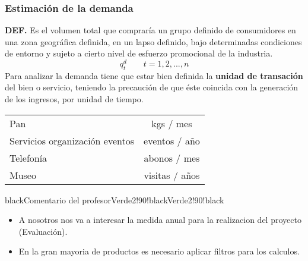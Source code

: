 \documentclass{templateNote}
\begin{document}
\subsubsection{Estimación de la demanda}
\textbf{DEF.} Es el volumen total que compraría un grupo definido de consumidores en una zona geográfica definida, en un lapso definido, bajo determinadas condiciones de entorno y sujeto a cierto nivel de esfuerzo promocional de la industria.
\begin{equation*}
  q_t^d \qquad t = 1,2,...,n
\end{equation*}
Para analizar la demanda tiene que estar bien definida la \textbf{unidad de transación} del bien o servicio, teniendo la precaución de que éste coincida con la generación de los ingresos, por unidad de tiempo.
\begin{center}
  \begin{tabular}{lc}
    \hline
    Pan & kgs / mes \\
    Servicios organización eventos & eventos / año \\
    Telefonía & abonos / mes \\
    Museo & visitas / años \\
    \hline
  \end{tabular}
\end{center}
\begin{CuadroPersonalizado}{black}{Comentario del profesor}{Verde2!90!black}{Verde2!90!black}
  \begin{itemize}
    \item A nosotros nos va a interesar la medida anual para la realizacion del proyecto (Evaluación).
    \item En la gran mayoria de productos es necesario aplicar filtros para los calculos.
  \end{itemize}
\end{CuadroPersonalizado}
\end{document}
